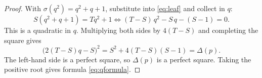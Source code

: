 \documentclass[10pt,a4paper]{amsart}
\begin{document}
\begin{proof} With $\sigma(q^2) = q^2 + q + 1$, substitute into \eqref{eq:leaf} and collect in $q$:
\[ S(q^2 + q + 1) = Tq^2 + 1 \iff (T - S)\,q^2 - S\,q - (S - 1) = 0.
\] This is a quadratic in $q$. Multiplying both sides by $4(T - S)$ and completing the square gives
\[ \bigl(2(T - S)q - S\bigr)^2 = S^2 + 4(T - S)(S - 1) = \Delta(p).
\] The left-hand side is a perfect square, so $\Delta(p)$ is a perfect square. Taking the positive root gives formula \eqref{eq:qformula}.
\end{proof}
\end{document}
